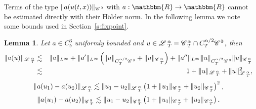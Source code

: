 \documentclass[11pt,reqno]{amsart}
\newtheorem{lemma}[theorem]{Lemma}
\newcommand{\CC}{\mathscr{C} \hspace{.1em}}
\newcommand{\LL}{\mathscr{L} \hspace{.2em}}
\begin{document}
Terms of the type $\| a (u (t, x)) \|_{\CC^0}$ with $a : \mathbbm{R}
\rightarrow \mathbbm{R}$ cannot be estimated directly with their H{\"o}lder
norm. In the following lemma we note some bounds used in
Section~\ref{s:fixpoint}.

\begin{lemma}
  Let $a \in C^3_b$ uniformly bounded and $u \in \LL^{\alpha}_T =
  \CC^{\alpha}_T \cap C_T^{\alpha / 2} \CC^0$, then
  \begin{eqnarray*}
    \| a (u) \|_{\LL^{\alpha}_T} & \lesssim & \| a \|_{L^{\infty}} + \| a'
    \|_{L^{\infty}} \left( \| u \|_{C_T^{\alpha / 2} \CC^0} + \| u
    \|_{\CC^{\alpha}_{_T}} \right) + \| a'' \|_{L^{\infty}} \| u
    \|_{C_T^{\alpha / 2} \CC^0} \| u \|_{\CC^{\alpha}_{_T}}\\
    & \lesssim & 1 + \| u \|_{\LL^{\alpha}_T} + \| u \|^2_{\LL_T^{\alpha}},
  \end{eqnarray*}
  \[ \| a (u_1) - a (u_2) \|_{\LL_T^{\alpha}} \lesssim \| u_1 - u_2
     \|_{\LL^{\alpha}_T} \left( 1 + \| u_1 \|_{\CC^{\alpha}_T} + \| u_2
     \|_{\CC^{\alpha}_T} \right)^2, \]
  \[ \| a (u_1) - a (u_2) \|_{\CC_T^0} \lesssim \| u_1 - u_2 \|_{\CC^0_T}
     \left( 1 + \| u_1 \|_{\CC^{\alpha}_T} + \| u_2 \|_{\CC^{\alpha}_T}
     \right) . \]
\end{lemma}
\end{document}
